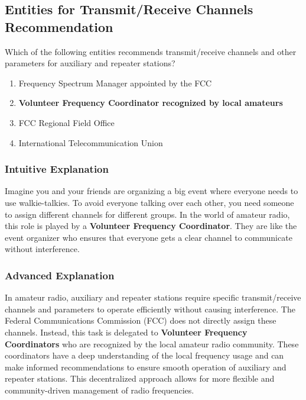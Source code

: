 \subsection{Entities for Transmit/Receive Channels Recommendation}
\label{T1A08}

\begin{tcolorbox}[colback=gray!10!white,colframe=black!75!black,title=T1A08]
Which of the following entities recommends transmit/receive channels and other parameters for auxiliary and repeater stations?
\begin{enumerate}[label=\Alph*),noitemsep]
    \item Frequency Spectrum Manager appointed by the FCC
    \item \textbf{Volunteer Frequency Coordinator recognized by local amateurs}
    \item FCC Regional Field Office
    \item International Telecommunication Union
\end{enumerate}
\end{tcolorbox}

\subsubsection*{Intuitive Explanation}
Imagine you and your friends are organizing a big event where everyone needs to use walkie-talkies. To avoid everyone talking over each other, you need someone to assign different channels for different groups. In the world of amateur radio, this role is played by a \textbf{Volunteer Frequency Coordinator}. They are like the event organizer who ensures that everyone gets a clear channel to communicate without interference.

\subsubsection*{Advanced Explanation}
In amateur radio, auxiliary and repeater stations require specific transmit/receive channels and parameters to operate efficiently without causing interference. The Federal Communications Commission (FCC) does not directly assign these channels. Instead, this task is delegated to \textbf{Volunteer Frequency Coordinators} who are recognized by the local amateur radio community. These coordinators have a deep understanding of the local frequency usage and can make informed recommendations to ensure smooth operation of auxiliary and repeater stations. This decentralized approach allows for more flexible and community-driven management of radio frequencies.